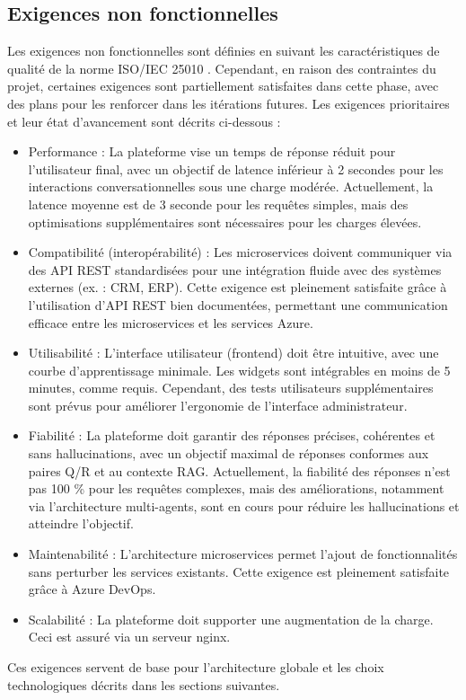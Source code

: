 \subsection{Exigences non fonctionnelles}
Les exigences non fonctionnelles sont définies en suivant les caractéristiques de qualité de la norme ISO/IEC 25010 \cite{iso}. Cependant, en raison des contraintes du projet, certaines exigences sont partiellement satisfaites dans cette phase, avec des plans pour les renforcer dans les itérations futures. Les exigences prioritaires et leur état d’avancement sont décrits ci-dessous :
\begin{itemize}[label=\textbullet]
\item Performance : La plateforme vise un temps de réponse réduit pour l’utilisateur final, avec un objectif de latence inférieur à 2 secondes pour les interactions conversationnelles sous une charge modérée. Actuellement, la latence moyenne est de 3 seconde pour les requêtes simples, mais des optimisations supplémentaires sont nécessaires pour les charges élevées.
\item Compatibilité (interopérabilité) : Les microservices doivent communiquer via des API REST standardisées pour une intégration fluide avec des systèmes externes (ex. : CRM, ERP). Cette exigence est pleinement satisfaite grâce à l’utilisation d’API REST bien documentées, permettant une communication efficace entre les microservices et les services Azure.
\item Utilisabilité : L’interface utilisateur (frontend) doit être intuitive, avec une courbe d’apprentissage minimale. Les widgets sont intégrables en moins de 5 minutes, comme requis. Cependant, des tests utilisateurs supplémentaires sont prévus pour améliorer l’ergonomie de l’interface administrateur.
\item Fiabilité : La plateforme doit garantir des réponses précises, cohérentes et sans hallucinations, avec un objectif maximal de réponses conformes aux paires Q/R et au contexte RAG. Actuellement, la fiabilité des réponses n'est pas 100 \% pour les requêtes complexes, mais des améliorations, notamment via l’architecture multi-agents, sont en cours pour réduire les hallucinations et atteindre l’objectif.
\item Maintenabilité : L’architecture microservices permet l’ajout de fonctionnalités sans perturber les services existants. Cette exigence est pleinement satisfaite grâce à Azure DevOps.
\item Scalabilité : La plateforme doit supporter une augmentation de la charge. Ceci est assuré via un serveur nginx.
\end{itemize}
Ces exigences servent de base pour l’architecture globale et les choix technologiques décrits dans les sections suivantes.
